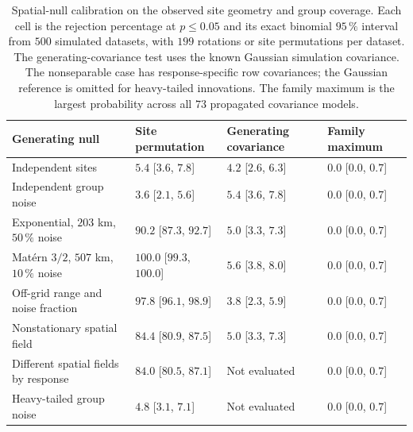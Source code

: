 \begin{table}[htbp]\centering\footnotesize
\caption{Spatial-null calibration on the observed site geometry and group coverage. Each cell is the rejection percentage at $p\leq0.05$ and its exact binomial $95\,\%$ interval from $500$ simulated datasets, with $199$ rotations or site permutations per dataset. The generating-covariance test uses the known Gaussian simulation covariance. The nonseparable case has response-specific row covariances; the Gaussian reference is omitted for heavy-tailed innovations. The family maximum is the largest probability across all $73$ propagated covariance models.}
\label{tab:spatial-calibration}
\begin{tabular}{P{4.4cm}P{2.6cm}P{2.6cm}P{2.6cm}}\toprule
Generating null & Site permutation & Generating covariance & Family maximum \\\midrule
Independent sites & $5.4$ [$3.6$, $7.8$] & $4.2$ [$2.6$, $6.3$] & $0.0$ [$0.0$, $0.7$] \\
Independent group noise & $3.6$ [$2.1$, $5.6$] & $5.4$ [$3.6$, $7.8$] & $0.0$ [$0.0$, $0.7$] \\
Exponential, $203$ km, $50\,\%$ noise & $90.2$ [$87.3$, $92.7$] & $5.0$ [$3.3$, $7.3$] & $0.0$ [$0.0$, $0.7$] \\
Mat\'ern $3/2$, $507$ km, $10\,\%$ noise & $100.0$ [$99.3$, $100.0$] & $5.6$ [$3.8$, $8.0$] & $0.0$ [$0.0$, $0.7$] \\
Off-grid range and noise fraction & $97.8$ [$96.1$, $98.9$] & $3.8$ [$2.3$, $5.9$] & $0.0$ [$0.0$, $0.7$] \\
Nonstationary spatial field & $84.4$ [$80.9$, $87.5$] & $5.0$ [$3.3$, $7.3$] & $0.0$ [$0.0$, $0.7$] \\
Different spatial fields by response & $84.0$ [$80.5$, $87.1$] & Not evaluated & $0.0$ [$0.0$, $0.7$] \\
Heavy-tailed group noise & $4.8$ [$3.1$, $7.1$] & Not evaluated & $0.0$ [$0.0$, $0.7$] \\
\bottomrule\end{tabular}\end{table}
